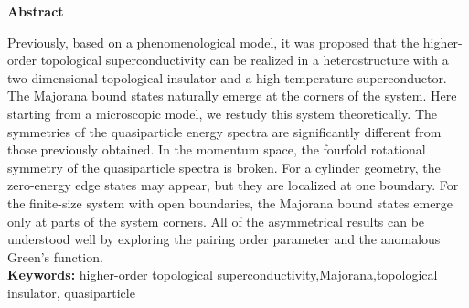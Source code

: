 \centerline{\bf Abstract}
\linespread{1.4}
Previously, based on a phenomenological model, it was proposed that the higher-order topological superconductivity can be realized in a heterostructure with a two-dimensional topological insulator and a high-temperature
superconductor. The Majorana bound states naturally emerge at the corners of the system. Here starting from a
microscopic model, we restudy this system theoretically. The symmetries of the quasiparticle energy spectra are
significantly different from those previously obtained. In the momentum space, the fourfold rotational symmetry
of the quasiparticle spectra is broken. For a cylinder geometry, the zero-energy edge states may appear, but
they are localized at one boundary. For the finite-size system with open boundaries, the Majorana bound states
emerge only at parts of the system corners. All of the asymmetrical results can be understood well by exploring
the pairing order parameter and the anomalous Green's function.\\
\noindent\textbf{ Keywords:} higher-order topological superconductivity,Majorana,topological insulator,
quasiparticle